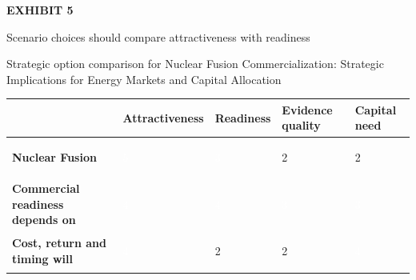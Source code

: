 \documentclass[10pt,a4paper]{article}
\begin{document}
\clearpage
{\textcolor{BOGreen}{\scriptsize\bfseries EXHIBIT 5}}\par\vspace{3pt}
{\sffamily\fontsize{15}{19}\selectfont\color{BONavy} Scenario choices should compare attractiveness with readiness}\par
{\small\color{BOText} Strategic option comparison for Nuclear Fusion Commercialization: Strategic Implications for Energy Markets and Capital Allocation}\par\vspace{4pt}
{\scriptsize\begin{tabular}{p{38mm}>{\centering\arraybackslash}p{21mm}>{\centering\arraybackslash}p{21mm}>{\centering\arraybackslash}p{21mm}>{\centering\arraybackslash}p{21mm}}
 & {\bfseries Attractiveness} & {\bfseries Readiness} & {\bfseries Evidence quality} & {\bfseries Capital need} \\
\hline
{\bfseries Nuclear Fusion} & \colorbox{BOGreen}{\textcolor{white}{\strut\hspace{5pt}5\hspace{5pt}}} & \colorbox{BOBlue}{\textcolor{white}{\strut\hspace{5pt}3\hspace{5pt}}} & \colorbox{BOLight}{\textcolor{BOText}{\strut\hspace{5pt}2\hspace{5pt}}} & \colorbox{BOLight}{\textcolor{BOText}{\strut\hspace{5pt}2\hspace{5pt}}} \\
{\bfseries Commercial readiness depends on} & \colorbox{BOGreen}{\textcolor{white}{\strut\hspace{5pt}4\hspace{5pt}}} & \colorbox{BOGreen}{\textcolor{white}{\strut\hspace{5pt}4\hspace{5pt}}} & \colorbox{BOBlue}{\textcolor{white}{\strut\hspace{5pt}3\hspace{5pt}}} & \colorbox{BOBlue}{\textcolor{white}{\strut\hspace{5pt}3\hspace{5pt}}} \\
{\bfseries Cost, return and timing will} & \colorbox{BOGreen}{\textcolor{white}{\strut\hspace{5pt}4\hspace{5pt}}} & \colorbox{BOLight}{\textcolor{BOText}{\strut\hspace{5pt}2\hspace{5pt}}} & \colorbox{BOLight}{\textcolor{BOText}{\strut\hspace{5pt}2\hspace{5pt}}} & \colorbox{BOGreen}{\textcolor{white}{\strut\hspace{5pt}4\hspace{5pt}}} \\

\end{tabular}}
\end{document}
